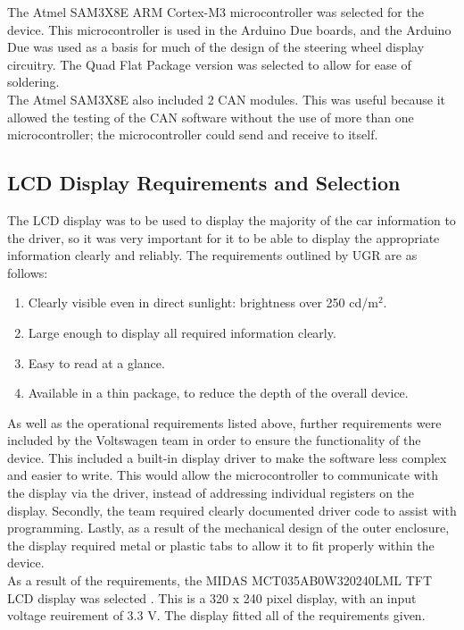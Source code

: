 \documentclass[a4paper,12pt]{article}
\begin{document}
The Atmel SAM3X8E ARM Cortex-M3 microcontroller was selected for the device. This microcontroller is used in the Arduino Due boards, and the Arduino Due was used as a basis for much of the design of the steering wheel display circuitry. The Quad Flat Package version was selected to allow for ease of soldering. \\

The Atmel SAM3X8E also included 2 CAN modules. This was useful because it allowed the testing of the CAN software without the use of more than one microcontroller; the microcontroller could send and receive to itself. \\

\subsection{LCD Display Requirements and Selection}
\label{sec:display}

The LCD display was to be used to display the majority of the car information to the driver, so it was very important for it to be able to display the appropriate information clearly and reliably. The requirements outlined by UGR are as follows:

\begin{enumerate}
  \item Clearly visible even in direct sunlight: brightness over 250 cd/$\textrm{m}^2$.
  \item Large enough to display all required information clearly.
  \item Easy to read at a glance.
  \item Available in a thin package, to reduce the depth of the overall device.
\end{enumerate}

As well as the operational requirements listed above, further requirements were included by the Voltswagen team in order to ensure the functionality of the device. This included a built-in display driver to make the software less complex and easier to write. This would allow the microcontroller to communicate with the display via the driver, instead of addressing individual registers on the display. Secondly, the team required clearly documented driver code to assist with programming. Lastly, as a result of the mechanical design of the outer enclosure, the display required metal or plastic tabs to allow it to fit properly within the device. \\

As a result of the requirements, the MIDAS MCT035AB0W320240LML TFT LCD display was selected \cite{display_datasheet}. This is a 320 x 240 pixel display, with an input voltage reuirement of 3.3 V. The display fitted all of the requirements given.
\end{document}

